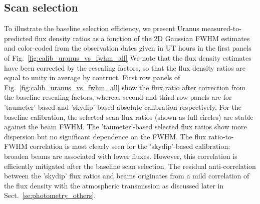 
 
\subsection{Scan selection}

To illustrate the baseline selection efficiency, we present Uranus
measured-to-predicted flux density ratios as a fonction of the 2D
Gaussian FWHM estimates and color-coded from the observation dates
given in UT hours in the first panels of
Fig.~\ref{fig:calib_uranus_vs_fwhm_all}
We note that the flux density estimates have been corrected by the
rescaling factors, so that the flux density ratios are equal to unity
in average by contruct. First row panels of
Fig.~\ref{fig:calib_uranus_vs_fwhm_all} show the flux ratio after
correction from the baseline rescaling factors, whereas second and
third row panels are for 'taumeter'-based and 'skydip'-based absolute
calibration respectively. For the baseline calibration, the selected
scan flux ratios (shown as full circles) are stable against the beam
FWHM. The 'taumeter'-based selected flux ratios show more dispersion
but no significant dependence on the FWHM. The flux ratio-to-FWHM
correlation is most clearly seen for the 'skydip'-based calibration:
broaden beams are associated with lower fluxes. However, this
correlation is efficiently mitigated after the baseline scan
selection. The residual anti-correlation between
the 'skydip' flux ratios and beams originates from a mild
correlation of the flux density with the atmospheric transmission as
discussed later in Sect.~\ref{se:photometry_others}. 

